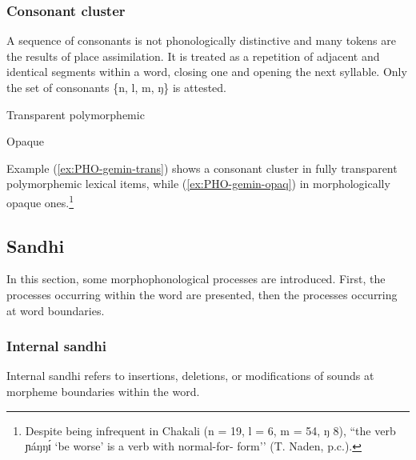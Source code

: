 \subsubsection{Consonant cluster}
\label{sec:PHO-gemination}

A sequence of consonants is not phonologically distinctive and many tokens are the results of place assimilation. It is treated as a repetition of adjacent and identical segments within a word, closing one and opening the next  syllable. Only the set of consonants \{{n, l, m, ŋ}\} is attested. 


\begin{exe}
	
	\ex\label{ex:PHO-gemin-trans}{\rm Transparent polymorphemic}
	\begin{xlist}
	      
	   
	    
			\end{xlist}	
		
	\ex\label{ex:PHO-gemin-opaq}{\rm Opaque}
		\begin{xlist}
	 \quad  {\rm `fist'}
	  \quad {\rm `be worse'}
	 \quad {\rm  `pepper'}
		\end{xlist}
\end{exe}


Example (\ref{ex:PHO-gemin-trans})  shows  a consonant cluster in fully 
transparent  polymorphemic lexical items, while (\ref{ex:PHO-gemin-opaq})  in 
morphologically opaque ones.\footnote{Despite being infrequent in Chakali ({\sls n} = 19, {\sls l} = 6, {\sls m} = 54, {\sls ŋ} 8), ``the verb {\sls ɲáŋŋɪ́} `be worse’ is a  verb with normal-for- form'' (T. Naden, p.c.).}

\subsection{Sandhi}
\label{sec:sandhi}

In this section,  some morphophonological processes are introduced. First,
the  processes occurring within the word are presented, then the processes
occurring at word boundaries. 

\subsubsection{Internal sandhi}
\label{sec:internal-sandhi}
Internal sandhi  refers to insertions, deletions,  or modifications of sounds
at morpheme boundaries within the word. 


